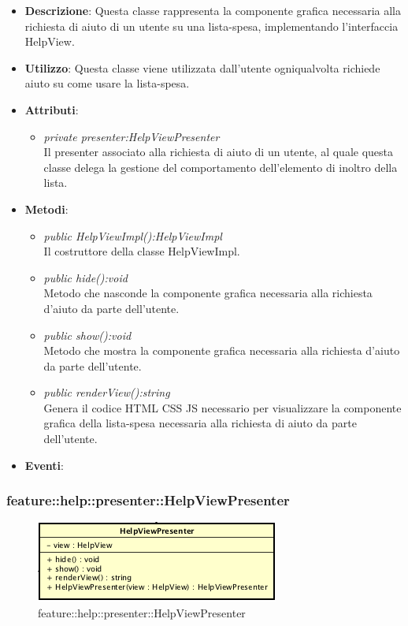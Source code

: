 \begin{itemize}
\item \textbf{Descrizione}: Questa classe rappresenta la componente grafica necessaria alla richiesta di aiuto di un utente su una lista-spesa, implementando l'interfaccia HelpView.
\item \textbf{Utilizzo}: Questa classe viene utilizzata dall'utente ogniqualvolta richiede aiuto su come usare la lista-spesa.
\item \textbf{Attributi}:
\begin{itemize}
\item \textit{private presenter:HelpViewPresenter}\\
Il presenter associato alla richiesta di aiuto di un utente, al quale questa classe delega la gestione del comportamento dell'elemento di inoltro della lista.
\end{itemize}
\item \textbf{Metodi}:
	\begin{itemize}
	\item \textit{public HelpViewImpl():HelpViewImpl}\\
	Il costruttore della classe HelpViewImpl.
	\item \textit{public hide():void}\\
	Metodo che nasconde la componente grafica necessaria alla richiesta d'aiuto da parte dell'utente.
	\item \textit{public show():void}\\
	Metodo che mostra la componente grafica necessaria alla richiesta d'aiuto da parte dell'utente.
	\item \textit{public renderView():string}\\
	Genera il codice HTML CSS JS necessario per visualizzare la componente grafica della lista-spesa necessaria alla richiesta di aiuto da parte dell'utente.
	\end{itemize}
\item \textbf{Eventi}:
\end{itemize}

\subsubsection{feature::help::presenter::HelpViewPresenter}

\label{feature::help::presenter::HelpViewPresenter}
\begin{figure}[ht]
	\centering
	\includegraphics[scale=0.5]{Sezioni/SottosezioniST/img/app/HelpViewPresenter.png}
	\caption{feature::help::presenter::HelpViewPresenter}
\end{figure}

